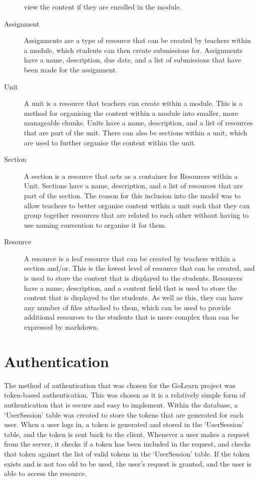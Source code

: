 \documentclass[12pt, a4paper,twoside]{report}
\theoremstyle{plain} %
\theoremstyle{definition} %
\numberwithin{equation}{chapter}
\begin{document}
\begin{description}
{        view the content if they are enrolled in the module.
    }
    \item[Assignment] {
        Assignments are a type of resource that can be created by teachers within
        a module, which students can then create submissions for. Assignments
        have a name, description, due date, and a list of submissions that have
        been made for the assignment.
    }
    \item[Unit] {
        A unit is a resource that teachers can create within a module. This is a
        method for organising the content within a module into smaller, more
        manageable chunks. Units have a name, description, and a list of resources
        that are part of the unit. There can also be sections within a unit, which
        are used to further organise the content within the unit.
    }
    \item[Section] {
        A section is a resource that acts as a container for Resources within a
        Unit. Sections have a name, description, and a list of resources that are
        part of the section. The reason for this inclusion into the model was to
        allow teachers to better organise content within a unit such that they can
        group together resources that are related to each other without having to
        use naming convention to organise it for them.
    }
    \item[Resource] {
        A resource is a leaf resource that can be created by teachers within a
        section and/or. This is the lowest level of resource that can be created,
        and is used to store the content that is displayed to the students. Resources
        have a name, description, and a content field that is used to store the
        content that is displayed to the students. As well as this, they can have any
        number of files attached to them, which can be used to provide additional
        resources to the students that is more complex than can be expressed by
        markdown.
    }
\end{description}

\section{Authentication}\label{sec:authentication}

The method of authentication that was chosen for the GoLearn project was token-based
authentication. This was chosen as it is a relatively simple form of authentication
that is secure and easy to implement. Within the database, a `UserSession' table was
created to store the tokens that are generated for each user. When a user logs in,
a token is generated and stored in the `UserSession' table, and the token is sent
back to the client. Whenever a user makes a request from the server, it checks if
a token has been included in the request, and checks that token against the list of
valid tokens in the `UserSession' table. If the token exists and is not too old to
be used, the user's request is granted, and the user is able to access the resource.
\end{document}
